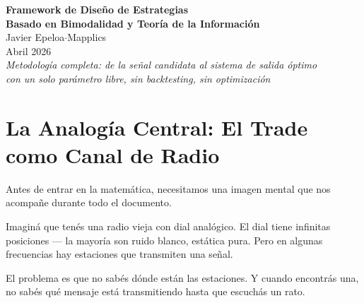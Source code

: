 \documentclass[11pt,a4paper]{article}
\begin{document}
\begin{center}
{\LARGE\bfseries Framework de Dise\~no de Estrategias}\\[4pt]
{\LARGE\bfseries Basado en Bimodalidad y Teor\'ia de la Informaci\'on}\\[16pt]
{\large Javier Epeloa\quad$\cdot$\quad Mapplics}\\[8pt]
{\normalsize Abril 2026}\\[4pt]
{\small\itshape Metodolog\'ia completa: de la se\~nal candidata al sistema de salida \'optimo\\
con un solo par\'ametro libre, sin backtesting, sin optimizaci\'on}
\end{center}

\vspace{12pt}

\begin{abstract}
Este documento describe un framework de cinco pasos para dise\~nar
sistemas de trading en cualquier mercado con microestructura observable.
El framework reduce un problema de 14 par\'ametros calibrados a un sistema
con un solo par\'ametro libre, una tabla emp\'irica, y un test estad\'istico
de falsificaci\'on. A lo largo del documento, cada concepto matem\'atico se
acompa\~na de una analog\'ia con un receptor de radio AM que sintoniza
estaciones, decodifica mensajes, y decide cu\'ando dejar de escuchar.
\end{abstract}

\tableofcontents
\newpage

\section{La Analog\'ia Central: El Trade como Canal de Radio}
\label{sec:analogia}

Antes de entrar en la matem\'atica, necesitamos una imagen mental
que nos acompa\~ne durante todo el documento.

\begin{tcolorbox}[radio, title=La radio]
Imagin\'a que ten\'es una radio vieja con dial anal\'ogico. El dial tiene
infinitas posiciones --- la mayor\'ia son ruido blanco, est\'atica pura.
Pero en algunas frecuencias hay estaciones que transmiten una se\~nal.

El problema es que no sab\'es d\'onde est\'an las estaciones. Y cuando
encontr\'as una, no sab\'es qu\'e mensaje est\'a transmitiendo hasta que
escuch\'as un rato.
\end{tcolorbox}
\end{document}

